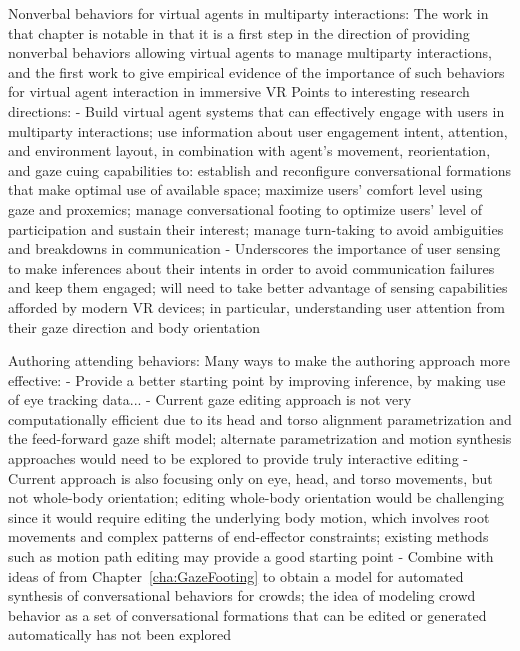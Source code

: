 Nonverbal behaviors for virtual agents in multiparty interactions:
The work in that chapter is notable in that it is a first step in the direction of providing nonverbal behaviors allowing virtual agents to manage multiparty interactions, and the first work to give empirical evidence of the importance of such behaviors for virtual agent interaction in immersive VR
Points to interesting research directions:
- Build virtual agent systems that can effectively engage with users in multiparty interactions; use information about user engagement intent, attention, and environment layout, in combination with agent's movement, reorientation, and gaze cuing capabilities to: establish and reconfigure conversational formations that make optimal use of available space; maximize users' comfort level using gaze and proxemics; manage conversational footing to optimize users' level of participation and sustain their interest; manage turn-taking to avoid ambiguities and breakdowns in communication
- Underscores the importance of user sensing to make inferences about their intents in order to avoid communication failures and keep them engaged; will need to take better advantage of sensing capabilities afforded by modern VR devices; in particular, understanding user attention from their gaze direction and body orientation

Authoring attending behaviors:
Many ways to make the authoring approach more effective:
- Provide a better starting point by improving inference, by making use of eye tracking data...
- Current gaze editing approach is not very computationally efficient due to its head and torso alignment parametrization and the feed-forward gaze shift model; alternate parametrization and motion synthesis approaches would need to be explored to provide truly interactive editing
- Current approach is also focusing only on eye, head, and torso movements, but not whole-body orientation; editing whole-body orientation would be challenging since it would require editing the underlying body motion, which involves root movements and complex patterns of end-effector constraints; existing methods such as motion path editing may provide a good starting point
- Combine with ideas of from Chapter~\ref{cha:GazeFooting} to obtain a model for automated synthesis of conversational behaviors for crowds; the idea of modeling crowd behavior as a set of conversational formations that can be edited or generated automatically has not been explored
